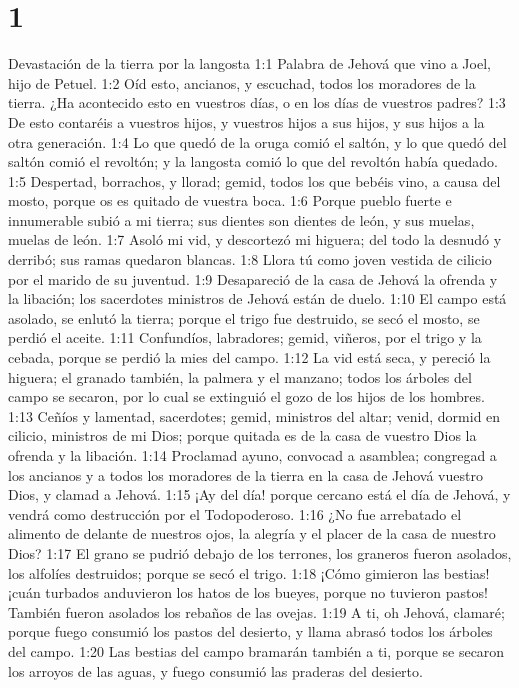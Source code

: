 
\chapter{1}

Devastación de la tierra por la langosta  
1:1 Palabra de Jehová que vino a Joel, hijo de Petuel.  
1:2 Oíd esto, ancianos, y escuchad, todos los moradores de la tierra. ¿Ha acontecido esto en vuestros días, o en los días de vuestros padres?  
1:3 De esto contaréis a vuestros hijos, y vuestros hijos a sus hijos, y sus hijos a la otra generación.  
1:4 Lo que quedó de la oruga comió el saltón, y lo que quedó del saltón comió el revoltón; y la langosta comió lo que del revoltón había quedado.  
1:5 Despertad, borrachos, y llorad; gemid, todos los que bebéis vino, a causa del mosto, porque os es quitado de vuestra boca.  
1:6 Porque pueblo fuerte e innumerable subió a mi tierra; sus dientes son dientes de león, y sus muelas, muelas de león.  
1:7 Asoló mi vid, y descortezó mi higuera; del todo la desnudó y derribó; sus ramas quedaron blancas.  
1:8 Llora tú como joven vestida de cilicio por el marido de su juventud.  
1:9 Desapareció de la casa de Jehová la ofrenda y la libación; los sacerdotes ministros de Jehová están de duelo.  
1:10 El campo está asolado, se enlutó la tierra; porque el trigo fue destruido, se secó el mosto, se perdió el aceite.  
1:11 Confundíos, labradores; gemid, viñeros, por el trigo y la cebada, porque se perdió la mies del campo.  
1:12 La vid está seca, y pereció la higuera; el granado también, la palmera y el manzano; todos los árboles del campo se secaron, por lo cual se extinguió el gozo de los hijos de los hombres.  
1:13 Ceñíos y lamentad, sacerdotes; gemid, ministros del altar; venid, dormid en cilicio, ministros de mi Dios; porque quitada es de la casa de vuestro Dios la ofrenda y la libación.  
1:14 Proclamad ayuno, convocad a asamblea; congregad a los ancianos y a todos los moradores de la tierra en la casa de Jehová vuestro Dios, y clamad a Jehová.  
1:15 ¡Ay del día! porque cercano está el día de Jehová, y vendrá como destrucción por el Todopoderoso. 
1:16 ¿No fue arrebatado el alimento de delante de nuestros ojos, la alegría y el placer de la casa de nuestro Dios?  
1:17 El grano se pudrió debajo de los terrones, los graneros fueron asolados, los alfolíes destruidos; porque se secó el trigo.  
1:18 ¡Cómo gimieron las bestias! ¡cuán turbados anduvieron los hatos de los bueyes, porque no tuvieron pastos! También fueron asolados los rebaños de las ovejas.  
1:19 A ti, oh Jehová, clamaré; porque fuego consumió los pastos del desierto, y llama abrasó todos los árboles del campo.  
1:20 Las bestias del campo bramarán también a ti, porque se secaron los arroyos de las aguas, y fuego consumió las praderas del desierto.  

